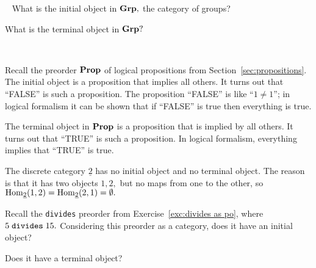 \documentclass[../main/CT4S-EN-RU]{subfiles}
\begin{document}
\begin{exampleRUS}\label{ex:initial monoid terminal monoid}
\end{exampleRUS}

\begin{exerciseENG}~
\sexc What is the initial object in ${\mathbf{Grp}},$ the category of groups?
\item What is the terminal object in ${\mathbf{Grp}}?$
\endsexc
\end{exerciseENG}

\begin{exerciseRUS}~
\end{exerciseRUS}

\begin{exampleENG}
Recall the preorder ${\mathbf{Prop}}$ of logical propositions from Section~\ref{sec:propositions}. The initial object is a proposition that implies all others. It turns out that “FALSE” is such a proposition. The proposition “FALSE” is like “$1\neq1$”; in logical formalism it can be shown that if “FALSE” is true then everything is true.

The terminal object in ${\mathbf{Prop}}$ is a proposition that is implied by all others. It turns out that “TRUE” is such a proposition. In logical formalism, everything implies that “TRUE” is true.
\end{exampleENG}

\begin{exampleRUS}
\end{exampleRUS}

\begin{exampleENG}
The discrete category $\underline{2}$ has no initial object and no terminal object. The reason is that it has two objects $1,2,$ but no maps from one to the other, so $\operatorname{Hom}_{\underline{2}}(1,2)=\operatorname{Hom}_{\underline{2}}(2,1)=\emptyset.$
\end{exampleENG}

\begin{exampleRUS}
\end{exampleRUS}

\begin{exerciseENG}
Recall the {\tt divides} preorder from Exercise~\ref{exc:divides as po}, where $5\;{\tt divides}\;15.$
\sexc Considering this preorder as a category, does it have an initial object?
\item Does it have a terminal object?
\endsexc
\end{exerciseENG}

\begin{exerciseRUS}
\end{exerciseRUS}
\end{document}
